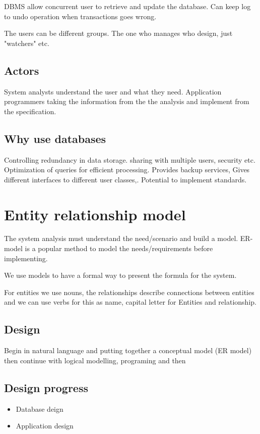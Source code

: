DBMS allow concurrent user to retrieve and update the database. Can keep log to undo operation when transactions goes wrong. 

The users can be different groups. The one who manages who design, just "watchers"  etc. 

\subsection*{Actors}
System analysts understand the user and what they need. Application programmers taking the information from the the analysis and implement from the specification. 

\subsection*{Why use databases}
Controlling redundancy in data storage. sharing with multiple users, security etc.
Optimization of queries for efficient processing. Provides backup services, Gives different interfaces to different user classes,.
Potential to implement standards.

\section{Entity relationship model}
The system analysis must understand the need/scenario and build a model. ER-model is a popular method to model the needs/requirements before implementing.

We use models to have a formal way to present the formula for the system. 

For entities we use nouns, the relationships describe connections between entities and we can use verbs for this as name, capital letter for Entities and relationship. 

\subsection*{Design}
Begin in natural language and putting together a conceptual model (ER model) then continue with logical modelling, programing and then  

\subsection*{Design progress}
\begin{itemize}
	\item Database deign
	\item Application design
\end{itemize}

